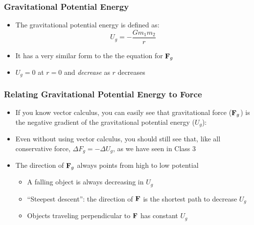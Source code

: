 \documentclass[12pt,compress,aspectratio=169]{beamer}
\newcommand{\mb}[1]{\ensuremath\mathbf{#1}}
\begin{document}
\begin{frame}
  \frametitle{Gravitational Potential Energy}

  \begin{itemize}
  \item The gravitational potential energy is defined as:
    {\Large
      \begin{displaymath}
        \boxed{U_g=-\frac{Gm_1m_2}{r}}
    \end{displaymath}
    }
  \item It has a very similar form to the the equation for $\mb{F}_g$
  \item $U_g=0$ at $r=0$ and \emph{decrease} as $r$ decreases
  \end{itemize}
\end{frame}


\begin{frame}
  \frametitle{Relating Gravitational Potential Energy to Force}
  \begin{itemize}
  \item If you know vector calculus, you can easily see that gravitational
    force ($\mb{F}_g$) is the negative gradient of the gravitational potential
    energy ($U_g$):

    \vspace{-0.1in}{\Large
      \begin{displaymath}
        \mb{F}_g=-\nabla U_g=
        -\frac{\partial U_g}{\partial r}\hat{\mb{r}}
      \end{displaymath}
    }
  \item Even without using vector calculus, you should still see that, like
    all conservative force, $\Delta F_g=-\Delta U_g$, as we have seen in Class
    3
  \item The direction of $\mb{F}_g$ always points from high to low potential
    \begin{itemize}
    \item A falling object is always decreasing in $U_g$
    \item ``Steepest descent'': the direction of $\mb{F}$ is the shortest path
      to decrease $U_g$ 
    \item Objects traveling perpendicular to $\mb{F}$ has constant $U_g$
    \end{itemize}
  \end{itemize}
\end{frame}
\end{document}
